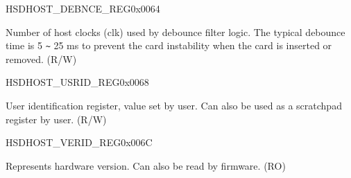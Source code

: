 \begin{register}{H}{SDHOST\_DEBNCE\_REG}{0x{}0064}\label{regdesc:DEBNCEREG}
%
%
\regnewline%
\begin{regdesc}\begin{reglist}
\item [SDHOST\_DEBOUNCE\_COUNT]Number of host clocks (clk) used by debounce filter logic. The typical debounce time is 5 \verb+~+ 25 ms to prevent the card instability when the card is inserted or removed. (R/W)
\end{reglist}\end{regdesc}
\end{register}


\begin{register}{H}{SDHOST\_USRID\_REG}{0x{}0068}\label{regdesc:USRIDREG}
%
\regnewline%
\begin{regdesc}\begin{reglist}
\item [SDHOST\_USRID\_REG]User identification register, value set by user. Can also be used as a scratchpad register by user. (R/W)
\end{reglist}\end{regdesc}
\end{register}

\begin{register}{H}{SDHOST\_VERID\_REG}{0x{}006C}\label{regdesc:VERIDREG}
%
\regnewline%
\begin{regdesc}\begin{reglist}
\item [SDHOST\_VERSIONID\_REG] Represents hardware version. Can also be read by firmware. (RO)
\end{reglist}\end{regdesc}
\end{register}

